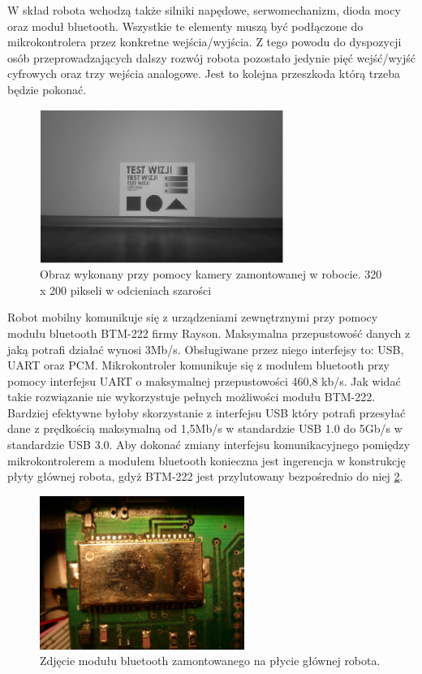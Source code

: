 W skład robota wchodzą także silniki napędowe, serwomechanizm, dioda mocy oraz moduł bluetooth. Wszystkie te elementy muszą być podłączone do mikrokontrolera przez konkretne wejścia/wyjścia. Z tego powodu do dyspozycji osób przeprowadzających dalszy rozwój robota pozostało jedynie pięć wejść/wyjść cyfrowych oraz trzy wejścia analogowe. Jest to kolejna przeszkoda którą trzeba będzie pokonać.

\begin{figure}[!ht]
 \centering
 \includegraphics[height=50mm]{../images/ch02/320x200B&W.jpg}
 \caption{Obraz wykonany przy pomocy kamery zamontowanej w robocie. 320 x 200 pikseli w odcieniach szarości \cite{KmakMScThesis2009}}
 \label{fig:320x200BW}
\end{figure}

Robot mobilny komunikuje się z urządzeniami zewnętrznymi przy pomocy modułu bluetooth BTM-222 firmy Rayson. Maksymalna przepustowość danych z jaką potrafi działać wynosi 3Mb/s. Obsługiwane przez niego interfejsy to: USB, UART oraz PCM. Mikrokontroler komunikuje się z modułem bluetooth przy pomocy interfejsu UART o maksymalnej przepustowości 460,8 kb/s. Jak widać takie rozwiązanie nie wykorzystuje pełnych możliwości modułu BTM-222. Bardziej efektywne byłoby skorzystanie z interfejsu USB który potrafi przesyłać dane z prędkością maksymalną od 1,5Mb/s w standardzie USB 1.0 do 5Gb/s w standardzie USB 3.0. Aby dokonać zmiany interfejsu komunikacyjnego pomiędzy mikrokontrolerem a modułem bluetooth konieczna jest ingerencja w konstrukcję płyty głównej robota, gdyż BTM-222 jest przylutowany bezpośrednio do niej \ref{fig:BTM222}.

\begin{figure}[!ht]
 \centering
 \includegraphics[height=50mm]{../images/ch02/btm-222.jpg}
 \caption{Zdjęcie modułu bluetooth zamontowanego na płycie głównej robota.}
 \label{fig:BTM222}
\end{figure}

